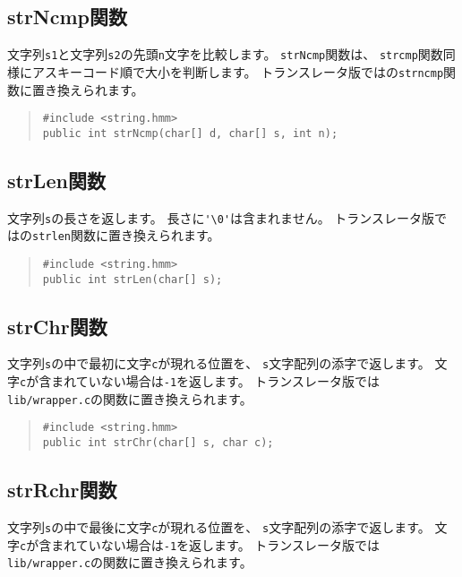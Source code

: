 \subsection{strNcmp関数}

文字列\verb/s1/と文字列\verb/s2/の先頭\verb/n/文字を比較します。
\verb/strNcmp/関数は、
\verb/strcmp/関数同様にアスキーコード順で大小を判断します。
トランスレータ版では\cl の\verb/strncmp/関数に置き換えられます。

\begin{quote}
\begin{verbatim}
#include <string.hmm>
public int strNcmp(char[] d, char[] s, int n);
\end{verbatim}
\end{quote}

\subsection{strLen関数}

文字列\verb/s/の長さを返します。
長さに\verb/'\0'/は含まれません。
トランスレータ版では\cl の\verb/strlen/関数に置き換えられます。

\begin{quote}
\begin{verbatim}
#include <string.hmm>
public int strLen(char[] s);
\end{verbatim}
\end{quote}

\subsection{strChr関数}

文字列\verb/s/の中で最初に文字\verb/c/が現れる位置を、
\verb/s/文字配列の添字で返します。
文字\verb/c/が含まれていない場合は\verb/-1/を返します。
トランスレータ版では\verb;lib/wrapper.c;の関数に置き換えられます。

\begin{quote}
\begin{verbatim}
#include <string.hmm>
public int strChr(char[] s, char c);
\end{verbatim}
\end{quote}

\subsection{strRchr関数}

文字列\verb/s/の中で最後に文字\verb/c/が現れる位置を、
\verb/s/文字配列の添字で返します。
文字\verb/c/が含まれていない場合は\verb/-1/を返します。
トランスレータ版では\verb;lib/wrapper.c;の関数に置き換えられます。

